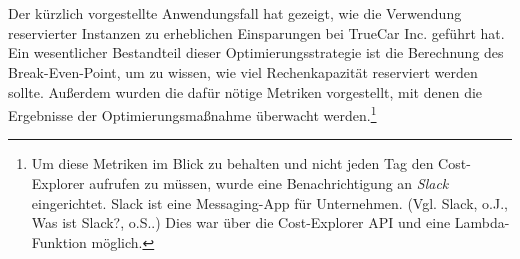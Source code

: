 \\\\
Der kürzlich vorgestellte Anwendungsfall hat gezeigt, wie die Verwendung reservierter Instanzen zu erheblichen Einsparungen bei TrueCar Inc. geführt hat. Ein wesentlicher Bestandteil dieser Optimierungsstrategie ist die Berechnung des Break-Even-Point, um zu wissen, wie viel Rechenkapazität reserviert werden sollte. Außerdem wurden die dafür nötige Metriken vorgestellt, mit denen die Ergebnisse der Optimierungsmaßnahme überwacht werden.\footnote{Um diese Metriken im Blick zu behalten und nicht jeden Tag den Cost-Explorer aufrufen zu müssen, wurde eine Benachrichtigung an \textit{Slack} eingerichtet. Slack ist eine Messaging-App für Unternehmen. (Vgl. Slack, o.J., Was ist Slack?, o.S.\cite{SLACK}.) Dies war über die Cost-Explorer API und eine Lambda-Funktion möglich.} 

